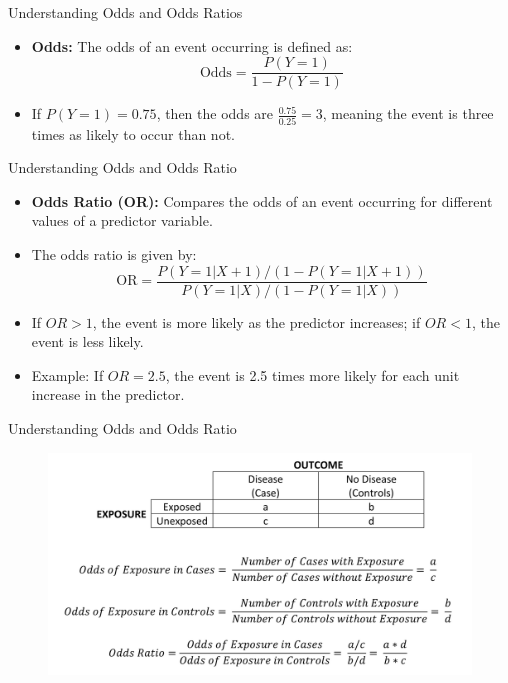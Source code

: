 \documentclass[aspectratio=169,xcolor=dvipsnames]{beamer}
\begin{document}
\begin{frame}{Understanding Odds and Odds Ratios}
    \begin{itemize}
        \item \textbf{Odds:} The odds of an event occurring is defined as:
        \begin{equation}
            \text{Odds} = \frac{P(Y=1)}{1 - P(Y=1)}
        \end{equation}
        \item If \( P(Y=1) = 0.75 \), then the odds are \( \frac{0.75}{0.25} = 3 \), meaning the event is three times as likely to occur than not.
    \end{itemize}
\end{frame}

\begin{frame}{Understanding Odds and Odds Ratio}
\begin{itemize}
\item \textbf{Odds Ratio (OR):} Compares the odds of an event occurring for different values of a predictor variable.
        \item The odds ratio is given by:
        \begin{equation}
            \text{OR} = \frac{P(Y=1 | X+1) / (1 - P(Y=1 | X+1))}{P(Y=1 | X) / (1 - P(Y=1 | X))}
        \end{equation}
        \item If \( OR > 1 \), the event is more likely as the predictor increases; if \( OR < 1 \), the event is less likely.
        \item Example: If \( OR = 2.5 \), the event is 2.5 times more likely for each unit increase in the predictor.
    \end{itemize}

\end{frame}

\begin{frame}{Understanding Odds and Odds Ratio}
    \begin{figure}
        \centering
        \includegraphics[width=0.8\linewidth]{images/odds_ratio.png}
    \end{figure}

\end{frame}
\end{document}
